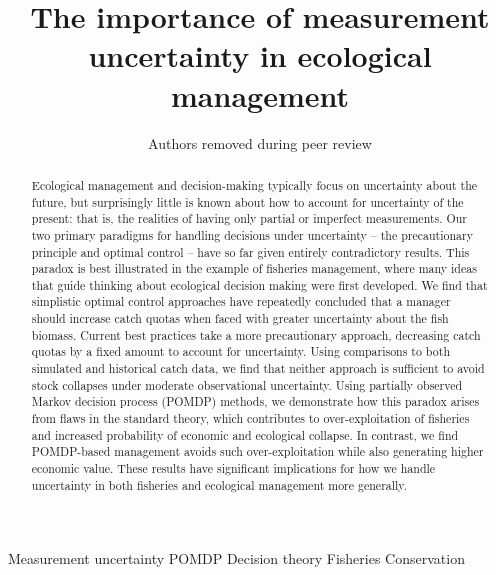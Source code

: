 \documentclass[3p]{elsarticle} %
\begin{document}
\begin{frontmatter}

  \title{The importance of measurement uncertainty in ecological management}
    \author[]{Authors removed during peer review}
  
  
    
  \begin{abstract}
  Ecological management and decision-making typically focus on uncertainty
  about the future, but surprisingly little is known about how to account
  for uncertainty of the present: that is, the realities of having only
  partial or imperfect measurements. Our two primary paradigms for
  handling decisions under uncertainty -- the precautionary principle and
  optimal control -- have so far given entirely contradictory results.
  This paradox is best illustrated in the example of fisheries management,
  where many ideas that guide thinking about ecological decision making
  were first developed. We find that simplistic optimal control approaches
  have repeatedly concluded that a manager should increase catch quotas
  when faced with greater uncertainty about the fish biomass. Current best
  practices take a more precautionary approach, decreasing catch quotas by
  a fixed amount to account for uncertainty. Using comparisons to both
  simulated and historical catch data, we find that neither approach is
  sufficient to avoid stock collapses under moderate observational
  uncertainty. Using partially observed Markov decision process (POMDP)
  methods, we demonstrate how this paradox arises from flaws in the
  standard theory, which contributes to over-exploitation of fisheries and
  increased probability of economic and ecological collapse. In contrast,
  we find POMDP-based management avoids such over-exploitation while also
  generating higher economic value. These results have significant
  implications for how we handle uncertainty in both fisheries and
  ecological management more generally.
  \end{abstract}
   \begin{keyword} Measurement uncertainty POMDP Decision theory Fisheries Conservation\end{keyword}
 \end{frontmatter}
\end{document}
